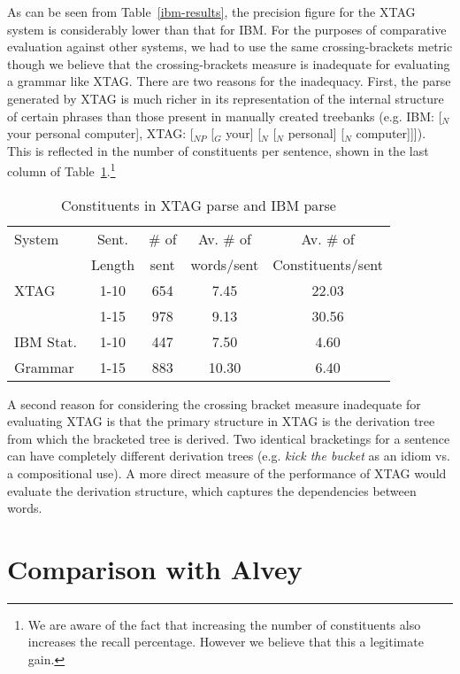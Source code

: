 As can be seen from Table~\ref{ibm-results}, the precision figure for
the XTAG system is considerably lower than that for IBM. For the
purposes of comparative evaluation against other systems, we had to
use the same crossing-brackets metric though we believe that the
crossing-brackets measure is inadequate for evaluating a grammar like
XTAG. There are two reasons for the inadequacy. First,
the parse generated by XTAG is much richer in its
representation of the internal structure of certain phrases than those
present in manually created treebanks (e.g. IBM: [$_N$ your personal
computer], XTAG: [$_{NP}$ [$_G$ your] [$_N$ [$_N$ personal] [$_N$
computer]]]). This is reflected in the number of constituents per
sentence, shown in the last column of
Table~\ref{const-no}.\footnote{We are aware of the fact that
increasing the number of constituents also increases the recall
percentage. However we believe that this a legitimate gain.}

\begin{table}[ht]
\centering
\begin{tabular}{|l|c|c|c|c|} \hline
System & Sent. & \# of & Av. \# of & Av. \# of \\
& Length & sent & words/sent & Constituents/sent \\ \hline
XTAG & 1-10 & 654 & 7.45 & 22.03  \\ \cline{2-5}
& 1-15 & 978 & 9.13 & 30.56 \\ \hline
IBM Stat. & 1-10 & 447 & 7.50 & 4.60 \\ \cline{2-5}
Grammar & 1-15 & 883 & 10.30 & 6.40 \\ \hline
\end{tabular}
\caption{Constituents in XTAG parse and IBM parse}
\label{const-no}
\end{table}

A second reason for considering the crossing bracket measure
inadequate for evaluating XTAG is that the primary
structure in XTAG is the derivation tree from which the bracketed tree
is derived. Two identical bracketings for a sentence can have
completely different derivation trees (e.g. {\it kick the bucket} as
an idiom vs. a compositional use). A more direct measure of the
performance of XTAG  would evaluate the derivation
structure, which captures the dependencies between words.

\section{Comparison with Alvey}

